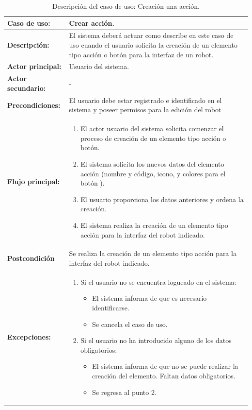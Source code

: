 \begin{table}[H]
  \begin{center}
    \begin{tabular}{|p{3.5cm}|p{10cm}|}
      \hline
      {\textbf{Caso de uso:}} & { Crear acción.} \\
      \hline
      {\textbf{Descripción:}} & { El sistema deberá actuar como describe en este caso de uso cuando el usuario solicita la creación de un elemento tipo acción o botón para la interfaz de un robot.} \\
     \hline
      {\textbf{Actor principal:}} & { Usuario del sistema.} \\
      \hline
      {\textbf{Actor secundario:}} & { - } \\
      \hline
      {\textbf{Precondiciones:}} & { El usuario debe estar registrado e identificado en el sistema y poseer permisos para la edición del robot } \\
     \hline   
    {\textbf{Flujo principal:}} & { 
      \begin{enumerate}
	\item El actor usuario del sistema solicita comenzar el proceso de creación de un elemento tipo acción o botón.
	\item El sistema solicita los nuevos datos del elemento acción (nombre y código, icono, y colores para el botón ).
	\item El usuario proporciona los datos anteriores y ordena la creación.
	\item El sistema realiza la creación de un elemento tipo acción para la interfaz del robot indicado.
      \end{enumerate}
      } \\
     \hline
     {\textbf{Postcondición}} & {Se realiza la creación de un elemento tipo acción para la interfaz del robot indicado.}\\
     \hline
      {\textbf{Excepciones:}} & {
	\begin{enumerate}
	\item Si el usuario no se encuentra logueado en el sistema:
	\begin{itemize}
	  \item El sistema informa de que es necesario identificarse.
	  \item Se cancela el caso de uso.
	\end{itemize}
	\item Si el usuario no ha introducido alguno de los datos obligatorios:
	  \begin{itemize}
	    \item El sistema informa de que no se puede realizar la creación del elemento. Faltan datos obligatorios.
	    \item Se regresa al punto 2.
	  \end{itemize}
	\end{enumerate}
	}\\
      \hline
    \end{tabular}
  \end{center}
\caption{Descripción del caso de uso: Creación una acción.}
\end{table}


